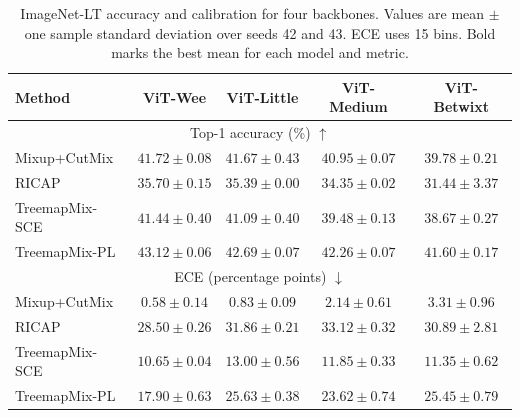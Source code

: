 \begin{table}[!htbp]
  \caption{ImageNet-LT accuracy and calibration for four backbones. Values are mean $\pm$ one sample standard deviation over seeds 42 and 43. ECE uses 15 bins. Bold marks the best mean for each model and metric.}
  \label{tab:long-tail-results}
  \centering
  \footnotesize
  \setlength{\tabcolsep}{4pt}
  \begin{tabular}{@{}lcccc@{}}
    \toprule
    Method & ViT-Wee & ViT-Little & ViT-Medium & ViT-Betwixt \\
    \midrule
    \multicolumn{5}{c}{Top-1 accuracy (\%) $\uparrow$} \\
    \midrule
    Mixup+CutMix & $41.72 \pm 0.08$ & $41.67 \pm 0.43$ & $40.95 \pm 0.07$ & $39.78 \pm 0.21$ \\
    RICAP & $35.70 \pm 0.15$ & $35.39 \pm 0.00$ & $34.35 \pm 0.02$ & $31.44 \pm 3.37$ \\
    TreemapMix-SCE & $41.44 \pm 0.40$ & $41.09 \pm 0.40$ & $39.48 \pm 0.13$ & $38.67 \pm 0.27$ \\
    TreemapMix-PL & $\mathbf{43.12 \pm 0.06}$ & $\mathbf{42.69 \pm 0.07}$ & $\mathbf{42.26 \pm 0.07}$ & $\mathbf{41.60 \pm 0.17}$ \\
    \midrule
    \multicolumn{5}{c}{ECE (percentage points) $\downarrow$} \\
    \midrule
    Mixup+CutMix & $\mathbf{0.58 \pm 0.14}$ & $\mathbf{0.83 \pm 0.09}$ & $\mathbf{2.14 \pm 0.61}$ & $\mathbf{3.31 \pm 0.96}$ \\
    RICAP & $28.50 \pm 0.26$ & $31.86 \pm 0.21$ & $33.12 \pm 0.32$ & $30.89 \pm 2.81$ \\
    TreemapMix-SCE & $10.65 \pm 0.04$ & $13.00 \pm 0.56$ & $11.85 \pm 0.33$ & $11.35 \pm 0.62$ \\
    TreemapMix-PL & $17.90 \pm 0.63$ & $25.63 \pm 0.38$ & $23.62 \pm 0.74$ & $25.45 \pm 0.79$ \\
    \bottomrule
  \end{tabular}
\end{table}

